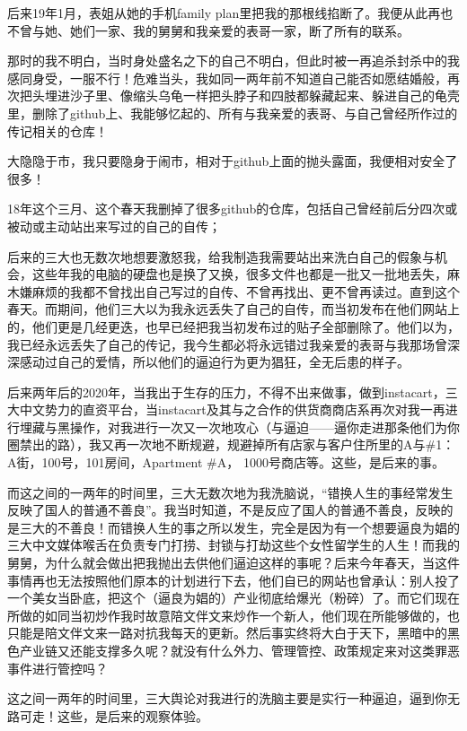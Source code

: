 \documentclass[9pt, b5paper]{article}
\begin{document}
后来19年1月，表姐从她的手机family plan里把我的那根线掐断了。我便从此再也不曾与她、她们一家、我的舅舅和我亲爱的表哥一家，断了所有的联系。 

那时的我不明白，当时身处盛名之下的自己不明白，但此时被一再追杀封杀中的我感同身受，一服不行！危难当头，我如同一两年前不知道自己能否如愿结婚般，再次把头埋进沙子里、像缩头乌龟一样把头脖子和四肢都躲藏起来、躲进自己的龟壳里，删除了github上、我能够忆起的、所有与我亲爱的表哥、与自己曾经所作过的传记相关的仓库！

大隐隐于市，我只要隐身于闹市，相对于github上面的抛头露面，我便相对安全了很多！

18年这个三月、这个春天我删掉了很多github的仓库，包括自己曾经前后分四次或被动或主动站出来写过的自己的自传；

后来的三大也无数次地想要激怒我，给我制造我需要站出来洗白自己的假象与机会，这些年我的电脑的硬盘也是换了又换，很多文件也都是一批又一批地丢失，麻木嫌麻烦的我都不曾找出自己写过的自传、不曾再找出、更不曾再读过。直到这个春天。而期间，他们三大以为我永远丢失了自己的自传，而当初发布在他们网站上的，他们更是几经更迭，也早已经把我当初发布过的贴子全部删除了。他们以为，我已经永远丢失了自己的传记，我今生都必将永远错过我亲爱的表哥与我那场曾深深感动过自己的爱情，所以他们的逼迫行为更为猖狂，全无后患的样子。 

后来两年后的2020年，当我出于生存的压力，不得不出来做事，做到instacart，三大中文势力的直资平台，当instacart及其与之合作的供货商商店系再次对我一再进行埋藏与黑操作，对我进行一次又一次地攻心（与逼迫——逼你走进那条他们为你圈禁出的路），我又再一次地不断规避，规避掉所有店家与客户住所里的A与\#1：A街，100号，101房间，Apartment \#A， 1000号商店等。这些，是后来的事。 

而这之间的一两年的时间里，三大无数次地为我洗脑说，“错换人生的事经常发生反映了国人的普通不善良”。我当时知道，不是反应了国人的普通不善良，反映的是三大的不善良！而错换人生的事之所以发生，完全是因为有一个想要逼良为娼的三大中文媒体喉舌在负责专门打捞、封锁与打劫这些个女性留学生的人生！而我的舅舅，为什么就会做出把我抛出去供他们逼迫这样的事呢？后来今年春天，当这件事情再也无法按照他们原本的计划进行下去，他们自已的网站也曾承认：别人投了一个美女当卧底，把这个（逼良为娼的）产业彻底给爆光（粉碎）了。而它们现在所做的如同当初炒作我时故意陪文伴文来炒作一个新人，他们现在所能够做的，也只能是陪文伴文来一路对抗我每天的更新。然后事实终将大白于天下，黑暗中的黑色产业链又还能支撑多久呢？就没有什么外力、管理管控、政策规定来对这类罪恶事件进行管控吗？

这之间一两年的时间里，三大舆论对我进行的洗脑主要是实行一种逼迫，逼到你无路可走！这些，是后来的观察体验。 
\end{document}
